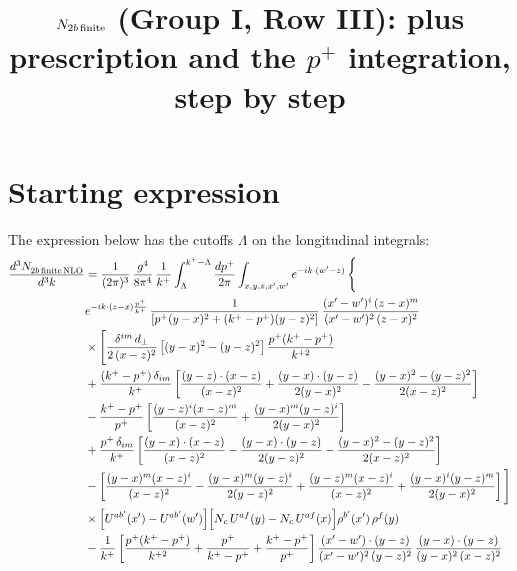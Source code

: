 \documentclass[10pt]{article}
\title{$N_{2b\,\rm finite}$ (Group I, Row III): plus prescription and the $p^{+}$ integration, step by step}
\date{}
\numberwithin{equation}{section}
\begin{document}
\maketitle

\section{Starting expression}
The expression below has the cutoffs $\Lambda$ on the longitudinal integrals:
\begin{align}
    \frac{d^{3}N_{2b\,\rm finite\, NLO}^{\rm}}{d^{3}k} & = \frac{1}{(2\pi)^{3}}\,\frac{g^{4}}{8\pi^{4}}\,\frac{1}{k^{+}}\int_{\Lambda}^{k^{+}-\Lambda}\frac{dp^{+}}{2\pi}\int_{x,y,z,x',w'}e^{-ik\cdot(w'-z)}\,\Bigg\{\notag\\
&e^{-ik\cdot(z-x)\frac{p^{+}}{k^{+}}}\,\frac{1}{\left[p^{+}(y-x)^{2}+(k^{+}-p^{+})(y-z)^{2}\right]}\,\frac{(x'-w')^{i}\,(z-x)^{m}}{(x'-w')^{2}\,(z-x)^{2}}\notag\\
&\times\Bigg[\frac{\delta^{im}\,d_{\perp}}{2\,(x-z)^{2}}\left[(y-x)^{2}-(y-z)^{2}\right]\frac{p^{+}(k^{+}-p^{+})}{k^{+2}}
\notag \\ & +\frac{(k^{+}-p^{+})\,\delta_{im}}{k^{+}}\left[\frac{(y-z)\cdot(x-z)}{(x-z)^{2}}+\frac{(y-x)\cdot(y-z)}{2(y-x)^{2}}-\frac{(y-x)^{2}-(y-z)^{2}}{2(x-z)^{2}}\right]\notag\\
&-\frac{k^{+}-p^{+}}{p^{+}}\left[\frac{(y-z)^{i}(x-z)^{m}}{(x-z)^{2}}+\frac{(y-x)^{m}(y-z)^{i}}{2(y-x)^{2}}\right]\notag\\
&+\frac{p^{+}\,\delta_{im}}{k^{+}}\left[\frac{(y-x)\cdot(x-z)}{(x-z)^{2}}-\frac{(y-x)\cdot(y-z)}{2(y-z)^{2}}-\frac{(y-x)^{2}-(y-z)^{2}}{2(x-z)^{2}}\right]\notag\\
&-\left[\frac{(y-x)^{m}(x-z)^{i}}{(x-z)^{2}}-\frac{(y-x)^{m}(y-z)^{i}}{2(y-z)^{2}}+\frac{(y-z)^{m}(x-z)^{i}}{(x-z)^{2}}+\frac{(y-x)^{i}(y-z)^{m}}{2(y-x)^{2}}\right]\Bigg]\notag\\
&\times\Big[U^{ab'}(x')-U^{ab'}(w')\Big]\Big[N_{c}\,U^{af}(y)-N_{c}\,U^{af}(x)\Big]\rho^{b'}(x')\,\rho^{f}(y)\notag\\
&-\frac{1}{k^{+}}\left[\frac{p^{+}(k^{+}-p^{+})}{k^{+2}}+\frac{p^{+}}{k^{+}-p^{+}}+\frac{k^{+}-p^{+}}{p^{+}}\right]
\frac{(x'-w')\cdot(y-z)}{(x'-w')^{2}\,(y-z)^{2}}\,\frac{(y-x)\cdot(y-z)}{(y-x)^{2}\,(x-z)^{2}}\notag\\

\end{align}
\end{document}
